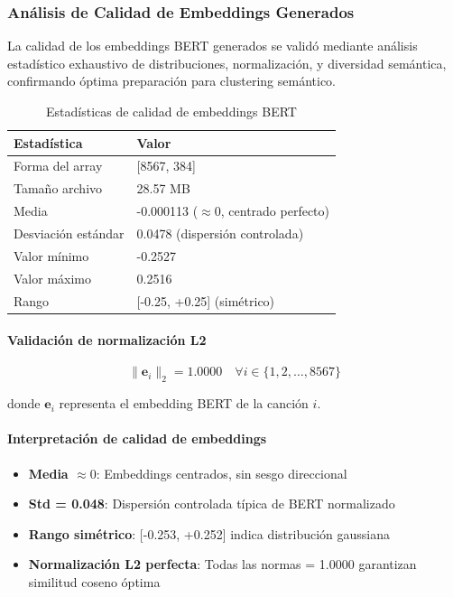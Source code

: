 \documentclass[12pt,a4paper]{report}
\begin{document}
\subsubsection{Análisis de Calidad de Embeddings Generados}

La calidad de los embeddings BERT generados se validó mediante análisis estadístico exhaustivo de distribuciones, normalización, y diversidad semántica, confirmando óptima preparación para clustering semántico.

\begin{table}[h]
\centering
\caption{Estadísticas de calidad de embeddings BERT}
\begin{tabular}{@{}ll@{}}
\toprule
\textbf{Estadística} & \textbf{Valor} \\
\midrule
Forma del array & [8567, 384] \\
Tamaño archivo & 28.57 MB \\
Media & -0.000113 ($\approx 0$, centrado perfecto) \\
Desviación estándar & 0.0478 (dispersión controlada) \\
Valor mínimo & -0.2527 \\
Valor máximo & 0.2516 \\
Rango & [-0.25, +0.25] (simétrico) \\
\bottomrule
\end{tabular}
\end{table}

\paragraph{Validación de normalización L2}

\begin{equation}
\|\mathbf{e}_i\|_2 = 1.0000 \quad \forall i \in \{1, 2, \ldots, 8567\}
\end{equation}

donde $\mathbf{e}_i$ representa el embedding BERT de la canción $i$.

\paragraph{Interpretación de calidad de embeddings}
\begin{itemize}
    \item \textbf{Media $\approx 0$}: Embeddings centrados, sin sesgo direccional
    \item \textbf{Std = 0.048}: Dispersión controlada típica de BERT normalizado
    \item \textbf{Rango simétrico}: [-0.253, +0.252] indica distribución gaussiana
    \item \textbf{Normalización L2 perfecta}: Todas las normas = 1.0000 garantizan similitud coseno óptima
\end{itemize}
\end{document}
